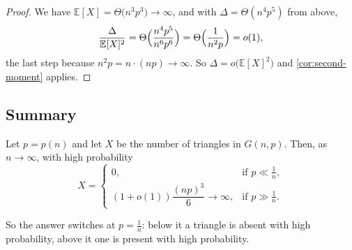 \begin{proof}
    We have \(\mathbb{E}[X] = \Theta\bigl( n^{3}p^{3} \bigr) \to \infty\), and with \(\Delta = \Theta(n^{4}p^{5})\) from above,
    \[
        \frac{\Delta}{\mathbb{E}[X]^{2}} = \Theta\Bigl( \frac{n^{4}p^{5}}{n^{6}p^{6}} \Bigr) = \Theta\Bigl( \frac{1}{n^{2}p} \Bigr) = o(1),
    \]
    the last step because \(n^{2}p = n \cdot (np) \to \infty\). So \(\Delta = o\bigl( \mathbb{E}[X]^{2} \bigr)\) and \autoref{cor:second-moment} applies.
\end{proof}

\subsection{Summary}

\begin{theorem}\label{thm:triangle-threshold}
    Let \(p = p(n)\) and let \(X\) be the number of triangles in \(G(n,p)\). Then, as \(n \to \infty\), with high probability
    \[
        X = \begin{cases}
            0, & \text{if } p \ll \frac{1}{n}, \\[2pt]
            (1+o(1)) \dfrac{(np)^{3}}{6} \to \infty, & \text{if } p \gg \frac{1}{n}.
        \end{cases}
    \]
\end{theorem}

So the answer switches at \(p = \frac{1}{n}\): below it a triangle is absent with high probability, above it one is present with high probability.
\begin{center}
\end{center}

